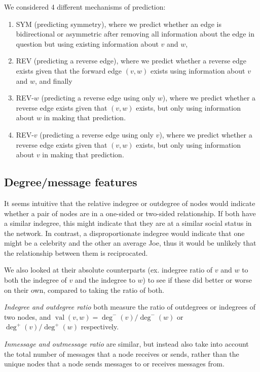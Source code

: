 \documentclass[conference]{IEEEtran}
\begin{document}
We considered 4 different mechanisms of prediction: 
\begin{enumerate}
\item SYM (predicting symmetry), where we predict whether an edge is bidirectional or asymmetric after removing all information about the edge in question but using existing information about $v$ and $w$, 
\item REV (predicting a reverse edge), where we predict whether a reverse edge exists given that the forward edge $(v,w)$ exists using information about $v$ and $w$, and finally 
\item REV-$w$ (predicting a reverse edge using only $w$), where we predict whether a reverse edge exists given that $(v,w)$ exists, but only using information about $w$ in making that prediction.
\item REV-$v$ (predicting a reverse edge using only $v$), where we predict whether a reverse edge exists given that $(v,w)$ exists, but only using information about $v$ in making that prediction.
\end{enumerate}

\subsection{Degree/message features}
It seems intuitive that the relative indegree or outdegree of nodes would indicate whether a pair of nodes are in a one-sided or two-sided relationship. If both have a similar indegree, this might indicate that they are at a similar social status in the network. In contrast, a disproportionate indegree would indicate that one might be a celebrity and the other an average Joe, thus it would be unlikely that the relationship between them is reciprocated.

We also looked at their absolute counterparts (ex. indegree ratio of $v$ and $w$ to both the indegree of $v$ and the indegree to $w$) to see if these did better or worse on their own, compared to taking the ratio of both.

\emph{Indegree and outdegree ratio} both measure the ratio of outdegrees or indegrees of two nodes, and $\operatorname{val}(v,w) = \deg^-(v)/\deg^-(w)$ or $\deg^+(v)/\deg^+(w)$ respectively.

\emph{Inmessage and outmessage ratio} are similar, but instead also take into account the total number of messages that a node receives or sends, rather than the unique nodes that a node sends messages to or receives messages from.
\end{document}

